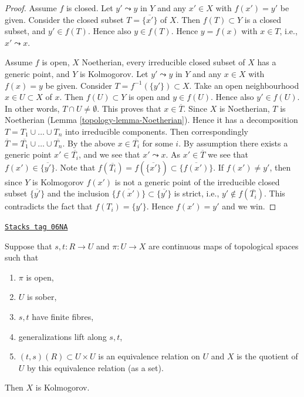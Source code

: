 \begin{proof}

Assume $f$ is closed. Let $y' \leadsto y$ in $Y$ and any $x'\in X$ with
$f(x') = y'$ be given. Consider the closed subset $T = \overline{\{x'\}}$
of $X$. Then $f(T) \subset Y$ is a closed subset, and $y' \in f(T)$.
Hence also $y \in f(T)$. Hence $y = f(x)$ with $x \in T$, i.e.,
$x' \leadsto x$.

\medskip\noindent
Assume $f$ is open, $X$ Noetherian, every irreducible closed subset of $X$
has a generic point, and $Y$ is Kolmogorov.
Let $y' \leadsto y$ in $Y$ and any $x \in X$ with
$f(x) = y$ be given. Consider $T = f^{-1}(\{y'\}) \subset X$.
Take an open neighbourhood $x \in U \subset X$ of $x$.
Then $f(U) \subset Y$ is open and $y \in f(U)$. Hence also $y' \in f(U)$.
In other words, $T \cap U \not = \emptyset$. This proves that
$x \in \overline{T}$. Since $X$ is Noetherian, $T$ is Noetherian
(Lemma \ref{topology-lemma-Noetherian}).
Hence it has a decomposition $T = T_1 \cup \ldots \cup T_n$ into irreducible
components. Then correspondingly
$\overline{T} = \overline{T_1} \cup \ldots \cup \overline{T_n}$.
By the above $x \in \overline{T_i}$ for some $i$. By assumption
there exists a generic point $x' \in \overline{T_i}$, and
we see that $x' \leadsto x$. As $x' \in \overline{T}$ we see that
$f(x') \in \overline{\{y'\}}$. Note that
$f(\overline{T_i}) = f(\overline{\{x'\}}) \subset \overline{\{f(x')\}}$.
If $f(x') \not = y'$, then since $Y$ is Kolmogorov $f(x')$ is not a generic
point of the irreducible closed subset $\overline{\{y'\}}$ and the inclusion
$\overline{\{f(x')\}} \subset \overline{\{y'\}}$
is strict, i.e., $y' \not \in f(\overline{T_i})$.
This contradicts the fact that $f(T_i) = \{y'\}$.
Hence $f(x') = y'$ and we win.
\end{proof}

\begin{lemma}
\label{topology-lemma-quotient-kolmogorov}
\href{https://stacks.math.columbia.edu/tag/06NA}{\texttt{Stacks tag 06NA}}

Suppose that $s, t : R \to U$ and $\pi : U \to X$ are continuous maps
of topological spaces such that
\begin{enumerate}
\item $\pi$ is open,
\item $U$ is sober,
\item $s, t$ have finite fibres,
\item generalizations lift along $s, t$,
\item $(t, s)(R) \subset U \times U$ is an equivalence relation on $U$ and
$X$ is the quotient of $U$ by this equivalence relation (as a set).
\end{enumerate}
Then $X$ is Kolmogorov.
\end{lemma}

